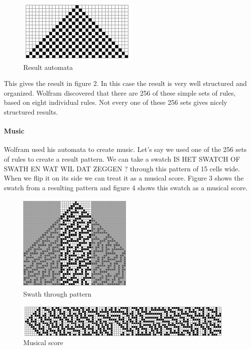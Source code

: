 \documentclass[12pt]{article}
\begin{document}
\begin{figure}[h]
\centering
\includegraphics[]{img/wolframResult-15}
\caption{Result automata}
\end{figure}

This gives the result in figure 2. In this case the result is very well structured and organized. Wolfram discovered that there are 256 of these simple sets of rules, based on eight individual rules. Not every one of these 256 sets gives nicely structured results.

\paragraph{Music}

Wolfram used his automata to create music. Let's say we used one of the 256 sets of rules to create a result pattern. We can take a swatch IS HET SWATCH OF SWATH EN WAT WIL DAT ZEGGEN ? through this pattern of 15 cells wide. When we flip it on its side we can treat it as a musical score.
Figure 3 shows the swatch from a resulting pattern and figure 4 shows this swatch as a musical score.

 \begin{figure}[h]
\centering
\includegraphics[]{img/wolframMusic1}
\caption{Swath through pattern}
\end{figure}

\begin{figure}[h]
\centering
\includegraphics[]{img/wolframMusic2}
\caption{Musical score}
\end{figure}
\end{document}

